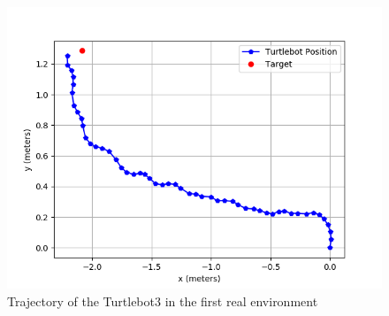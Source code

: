 \begin{figure}[htbp]
\centerline{\includegraphics[width=\columnwidth]{images/test_env1.png}}
\caption{Trajectory of the Turtlebot3 in the first real environment}
\label{fig:env1_graph}
\end{figure}

